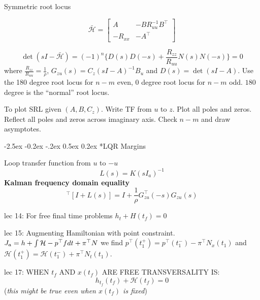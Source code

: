 \documentclass[letterpaper,twocolumn,notitlepage]{article}
\makeatletter
\renewcommand\subsection{\@startsection{subsection}{1}{\z@}%
{-2.5ex \@plus-0.2ex \@minus-.2ex}%
{0.5ex \@plus0.2ex}%
{\fontsize{9pt}{9pt}\selectfont\bfseries\sffamily}}
\def\smallint{\begingroup\textstyle\int\endgroup}
\makeatother
\begin{document}
  Symmetric root locus

  \begin{equation*}
    \bar{\mathcal{H}}=
    \begin{bmatrix}
      A & -BR_{uu}^{-1}B^{\top} \\[4pt]
      -R_{xx} & -A^{\top}
    \end{bmatrix}
  \end{equation*}

  \begin{equation*}
    \det(sI-\bar{\mathcal{H}})=(-1)^{n}\{D(s)D(-s)+\frac{R_{zz}}{R_{uu}}N(s)N(-s)\}=0
  \end{equation*}
  where $\frac{R_{zz}}{R_{uu}}=\frac{1}{\rho}$, $G_{zu}(s)=C_{z}(sI-A)^{-1}B_{u}$ and $D(s)=\det(sI-A)$.
  Use the 180 degree root locus for $n-m$ even, $0$ degree root locus for $n-m$ odd.
  $180$ degree is the ``normal'' root locus.

  To plot SRL given $(A,B,C_{z})$.
  Write TF from $u$ to $z$.
  Plot all poles and zeros.
  Reflect all poles and zeros across imaginary axis.
  Check $n-m$ and draw asymptotes.

  \subsection*{LQR Margins}

  Loop transfer function from $u$ to $-u$
  \begin{equation*}
    L(s)=K(sI_a)^{-1}
  \end{equation*}
  \textbf{Kalman frequency domain equality}
  \begin{equation*}
    [I+L(-s)]^{\top}[I+L(s)]=I+\frac{1}{\rho}G_{zu}^{\top}(-s)G_{zu}(s)
  \end{equation*}

  lec 14:
  For free final time problems $h_{t}+H(t_{f})=0$

  lec 15:
  Augmenting Hamiltonian with point constraint.
  $J_{a}=h+\smallint\mathcal{H}-p^{\top}f dt+\pi^{\top}N$ we find $p^{\top}(t_{1}^{+})=p^{\top}(t_{1}^{-})-\pi^{\top}N_{x}(t_{1})$ and $\mathcal{H}(t_{1}^{+})=\mathcal{H}(t_{1}^{-})+\pi^{\top}N_{t}(t_{1})$.

  lec 17:
  WHEN $t_{f}$ AND $x(t_{f})$ ARE FREE TRANSVERSALITY IS:\@
  \begin{equation*}
    h_{t_{f}}(t_{f})+\mathcal{H}(t_{f})=0
  \end{equation*}
  (\textit{this might be true even when $x(t_{f})$ is fixed})
\end{document}
